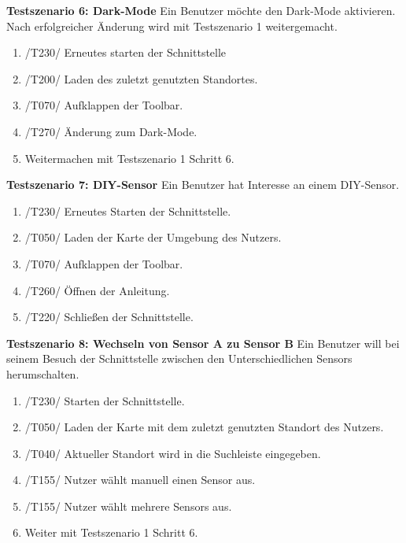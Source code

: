 \textbf{Testszenario 6: Dark-Mode}
\newline
Ein Benutzer möchte den Dark-Mode aktivieren. Nach erfolgreicher Änderung wird mit Testszenario 1 weitergemacht.
\begin{enumerate} [noitemsep]
    \item /T230/ Erneutes starten der Schnittstelle
    \item /T200/ Laden des zuletzt genutzten Standortes.
    \item /T070/ Aufklappen der \gls{Toolbar}.
    \item /T270/ Änderung zum Dark-Mode.
    \item Weitermachen mit Testszenario 1 Schritt 6.
\end{enumerate}

\textbf{Testszenario 7: \gls{DIY}-\gls{Sensor}}
\newline
Ein Benutzer hat Interesse an einem \gls{DIY}-\gls{Sensor}.
\begin{enumerate} [noitemsep]
    \item /T230/ Erneutes Starten der Schnittstelle.
    \item /T050/ Laden der Karte der Umgebung des Nutzers.
    \item /T070/ Aufklappen der \gls{Toolbar}.
    \item /T260/ Öffnen der Anleitung.
    \item /T220/ Schließen der Schnittstelle.
\end{enumerate}

\textbf{Testszenario 8: Wechseln von Sensor A zu Sensor B}
\newline
Ein Benutzer will bei seinem Besuch der Schnittstelle zwischen den Unterschiedlichen \glspl{Sensor} herumschalten. 
\begin{enumerate} [noitemsep]
    \item /T230/ Starten der Schnittstelle.
    \item /T050/ Laden der Karte mit dem zuletzt genutzten Standort des Nutzers.
    \item /T040/ Aktueller Standort wird in die Suchleiste eingegeben.
    \item /T155/ Nutzer wählt manuell einen Sensor aus.
    \item /T155/ Nutzer wählt mehrere \glspl{Sensor} aus.
    \item Weiter mit Testszenario 1 Schritt 6.
\end{enumerate}

